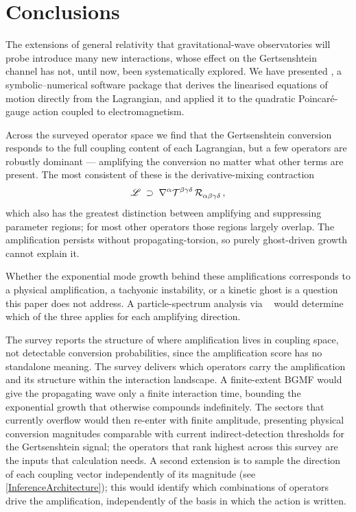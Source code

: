 
\section{Conclusions}%
\label{Conclusions}

The extensions of general relativity that gravitational-wave
observatories will probe introduce many new interactions, whose effect
on the Gertsenshtein channel has not, until now, been systematically
explored. We have presented \TIDAL{}, a symbolic--numerical software
package that derives the linearised equations of motion directly from
the Lagrangian, and applied it to the quadratic Poincar\'{e}-gauge
action coupled to electromagnetism.

Across the surveyed operator space we find that the Gertsenshtein
conversion responds to the full coupling content of each Lagrangian,
but a few operators are robustly dominant --- amplifying the
conversion no matter what other terms are present. The most consistent
of these is the derivative-mixing contraction
\begin{equation*}
    \lag \; \supset \; \rcD{^\alpha}\MAGT{^{\beta\gamma\delta}}\, \MAGF{_{\alpha\beta\gamma\delta}} \,,
\end{equation*}
which also has the greatest distinction between
amplifying and suppressing parameter regions; for most other operators
those regions largely overlap. The amplification persists without
propagating-torsion, so purely ghost-driven growth cannot explain
it.

Whether the exponential mode growth behind these amplifications
corresponds to a physical amplification, a tachyonic instability, or a
kinetic ghost is a question this paper does not address. A
particle-spectrum analysis via \PSALTer{}~\cite{barker2024psalter,barker2025psalter2}
would determine which of the three applies for each amplifying direction.

The survey reports the structure of where amplification lives in
coupling space, not detectable conversion probabilities, since
the amplification score has no standalone meaning. The survey
delivers which operators carry the amplification and its
structure within the interaction landscape.
A finite-extent BGMF would
give the propagating wave only a finite interaction time, bounding the
exponential growth that otherwise compounds indefinitely. The sectors
that currently overflow would then re-enter with
finite amplitude, presenting physical conversion magnitudes comparable with current
indirect-detection thresholds for the Gertsenshtein signal; the operators that rank
highest across this
survey are the inputs that calculation needs. A second
extension is to sample the direction of each coupling vector
independently of its magnitude (see \cref{InferenceArchitecture}); this would
identify which combinations of operators drive the amplification,
independently of the basis in which the action is written.

